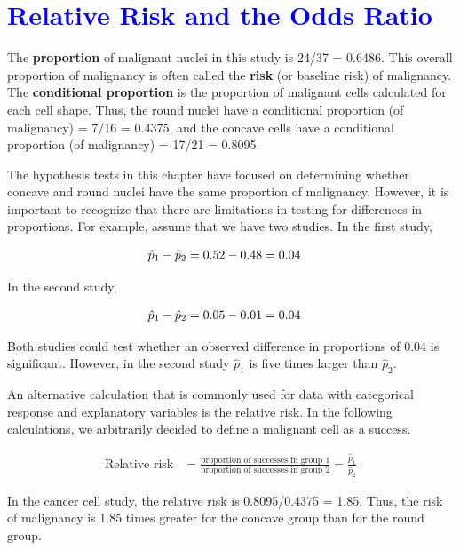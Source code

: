 \documentclass[
]{report}
\begin{document}
\hypertarget{section-55}{%
\section{\texorpdfstring{\textcolor{blue}{Relative Risk and the Odds Ratio}}{}}\label{section-55}}

The \textbf{proportion} of malignant nuclei in this study is 24/37 = 0.6486. This overall proportion of malignancy is often called the \textbf{risk} (or baseline risk) of malignancy. The \textbf{conditional proportion} is the proportion of malignant cells calculated for each cell shape. Thus, the round nuclei have a conditional proportion (of malignancy) = 7/16 = 0.4375, and the concave cells have a conditional proportion (of malignancy) = 17/21 = 0.8095.

The hypothesis tests in this chapter have focused on determining whether concave and round nuclei have the same proportion of malignancy. However, it is important to recognize that there are limitations in testing for differences in proportions. For example, assume that we have two studies. In the first study,

\begin{align}
\hat p_1 - \hat p_2 &= 0.52 - 0.48 = 0.04
\notag
\end{align}

In the second study,

\begin{align}
\hat p_1 - \hat p_2 &= 0.05 - 0.01 = 0.04 
\notag
\end{align}

Both studies could test whether an observed difference in proportions of 0.04 is significant. However, in the second study \(\scriptstyle \hat p_1\) is five times larger than \(\scriptstyle \hat p_2\).

An alternative calculation that is commonly used for data with categorical response and explanatory variables is the relative risk. In the following calculations, we arbitrarily decided to define a malignant cell as a success.

\begin{align}\label{5.4}
\text{Relative risk} &= \frac{\text{proportion of successes in group 1}}{\text{proportion of successes in group 2}} = \frac{\hat p_1}{\hat p_2} \tag{5.4}
\end{align}

In the cancer cell study, the relative risk is 0.8095/0.4375 = 1.85. Thus, the risk of malignancy is 1.85 times greater for the concave group than for the round group.
\end{document}
